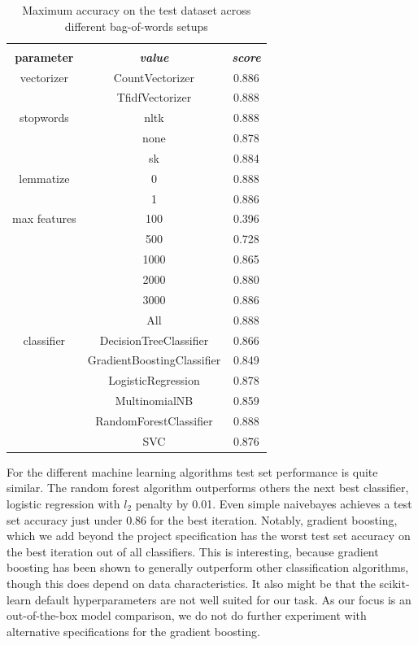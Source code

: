 \documentclass[conference]{IEEEtran}
\begin{document}
\begin{table}[htbp]
\caption{Maximum accuracy on the test dataset across different bag-of-words setups}
\begin{center}
\begin{tabular}{|c|c|c|}
\hline
\textbf{}&\multicolumn{2}{|c|}{\textbf{}} \\ 
\cline{2-3}
\textbf{parameter} & \textbf{\textit{value}}& \textbf{\textit{score}} \\ 
\hline
vectorizer & CountVectorizer & 0.886 \\ 
\cline{2-3}
 & TfidfVectorizer & 0.888 \\ 
\hline
stopwords & nltk & 0.888 \\ 
\cline{2-3}
 & none & 0.878 \\ 
\cline{2-3}
 & sk & 0.884 \\ 
\hline
lemmatize & 0 & 0.888 \\ 
\cline{2-3}
 & 1 & 0.886 \\ 
\hline
max features  & 100 & 0.396 \\ 
\cline{2-3}
  & 500 & 0.728 \\ 
\cline{2-3}
 & 1000 & 0.865 \\ 
\cline{2-3}
  & 2000 & 0.880 \\ 
\cline{2-3}
  & 3000 & 0.886 \\ 
\cline{2-3}
 & All & 0.888 \\ 
\hline
classifier & DecisionTreeClassifier & 0.866 \\ 
\cline{2-3}
 & GradientBoostingClassifier & 0.849 \\ 
\cline{2-3}
 & LogisticRegression & 0.878 \\ 
\cline{2-3}
 & MultinomialNB & 0.859 \\ 
\cline{2-3}
 & RandomForestClassifier & 0.888 \\ 
\cline{2-3}
 & SVC & 0.876 \\ 
\hline
\end{tabular}
\label{tab5}
\end{center}
\end{table}

For the different machine learning algorithms test set performance is quite similar. The random forest algorithm outperforms others the next best classifier, logistic regression with $l_2$ penalty by 0.01. Even simple naivebayes achieves a test set accuracy just under 0.86 for the best iteration. Notably, gradient boosting, which we add beyond the project specification has the worst test set accuracy on the best iteration out of all classifiers. This is interesting, because gradient boosting has been shown to generally outperform other classification algorithms, though this does depend on data characteristics\cite{gbacc}. It also might be that the scikit-learn default hyperparameters are not well suited for our task. As our focus is an out-of-the-box model comparison, we do not do further experiment with alternative specifications for the gradient boosting.
\end{document}
